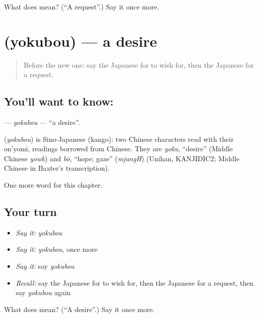 \begin{tcolorbox}[breakable,colback=teal!4,colframe=teal!35!black,title={Before you move on}]
What does  mean? (\textquotedblleft{}A request\textquotedblright{}.) Say it once more.
\end{tcolorbox}
\section[\texorpdfstring{\ja{よくぼう} (yokubou)}{よくぼう (yokubou)}]{ (yokubou) — a desire}

\label{lesson:JA-C92-yokubou}



\begin{quote}
Before the new one: say the Japanese for to wish for, then the Japanese for a request.
\end{quote}

\subsection*{You'll want to know: }
\textbf{} — \emph{yokubou} — \textquotedblleft{}a desire\textquotedblright{}.

\begin{cousinweb}
\textbf{} (\emph{yokubou}) is Sino-Japanese (kango): two Chinese characters read with their on'yomi, readings borrowed from Chinese. They are \emph{yoku}, \textquotedblleft{}desire\textquotedblright{} (Middle Chinese \emph{yowk}) and \emph{bō}, \textquotedblleft{}hope; gaze\textquotedblright{} (\emph{mjangH}) (Unihan, KANJIDIC2; Middle Chinese in Baxter's transcription).
\end{cousinweb}

\begin{grammarlens}[title={What you've built}]
One more word for this chapter.
\end{grammarlens}

\subsection*{Your turn}
\begin{itemize}
\raggedright
  \item \emph{Say it:} \emph{yokubou}
  \item \emph{Say it:} \emph{yokubou}, once more
  \item \emph{Say it:} say \emph{yokubou}
  \item \emph{Recall:} say the Japanese for to wish for, then the Japanese for a request, then say \emph{yokubou} again
\end{itemize}

\begin{tcolorbox}[breakable,colback=teal!4,colframe=teal!35!black,title={Before you move on}]
What does  mean? (\textquotedblleft{}A desire\textquotedblright{}.) Say it once more.
\end{tcolorbox}
